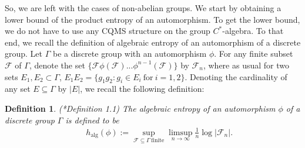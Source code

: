 \documentclass[a4paper,11pt,reqno]{amsart}
\theoremstyle{plain}
\newtheorem{defn}[thm]{Definition}
\theoremstyle{mainthmstyle}
\theoremstyle{named}
\numberwithin{equation}{section}
\begin{document}
So, we are left with the cases of non-abelian groups. We start by obtaining a lower bound of the product entropy of an automorphism. To get the lower bound, we do not have to use any CQMS structure on the group $C^{\ast}$-algebra. To that end, we recall the definition of algebraic entropy of an automorphism of a discrete group. Let $\Gamma$ be a discrete group with an automorphism $\phi$. For any finite subset $\mathcal{F}$ of $\Gamma$, denote the set $\{\mathcal{F}\phi(\mathcal{F})...\phi^{n-1}(\mathcal{F})\}$ by $\mathcal{F}_n$, where as usual for two sets $E_1,E_2\subset\Gamma$, $E_1E_2=\{g_{1}g_{2}:g_{i}\in E_{i} \ \mathrm{for} \ i=1,2\}$. Denoting the cardinality of any set $E\subseteq\Gamma$ by $\lvert E\rvert$, we recall the following definition:
\begin{defn}\label{algentp}(\cite{MR0385834}*{Definition 1.1})
    The algebraic entropy of an automorphism $\phi$ of a discrete group $\Gamma$ is defined to be
    \begin{align*}
        && h_{\mathrm{alg}}(\phi):=\sup_{\mathcal{F}\subseteq\Gamma \ \textrm{finite}}\limsup\limits_{n\to\infty}\frac{1}{n}\log\lvert\mathcal{F}_n\rvert.
    \end{align*}
\end{defn}
\end{document}
